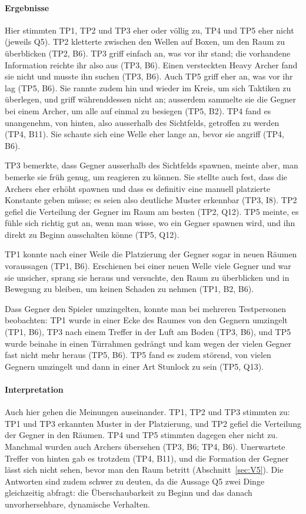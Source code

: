 \documentclass[../Main.tex]{subfiles}
\begin{document}
\paragraph{Ergebnisse}
Hier stimmten TP1, TP2 und TP3 eher oder völlig zu, TP4 und TP5 eher nicht (jeweils Q5). TP2 kletterte zwischen den Wellen auf Boxen, um den Raum zu überblicken (TP2, B6). TP3 griff einfach an, was vor ihr stand; die vorhandene Information reichte ihr also aus (TP3, B6). Einen versteckten Heavy Archer fand sie nicht und musste ihn suchen (TP3, B6). Auch TP5 griff eher an, was vor ihr lag (TP5, B6). Sie rannte zudem hin und wieder im Kreis, um sich Taktiken zu überlegen, und griff währenddessen nicht an; ausserdem sammelte sie die Gegner bei einem Archer, um alle auf einmal zu besiegen (TP5, B2). TP4 fand es unangenehm, von hinten, also ausserhalb des Sichtfelds, getroffen zu werden (TP4, B11). Sie schaute sich eine Welle eher lange an, bevor sie angriff (TP4, B6).

TP3 bemerkte, dass Gegner ausserhalb des Sichtfelds spawnen, meinte aber, man bemerke sie früh genug, um reagieren zu können. Sie stellte auch fest, dass die Archers eher erhöht spawnen und dass es definitiv eine manuell platzierte Konstante geben müsse; es seien also deutliche Muster erkennbar (TP3, I8). TP2 gefiel die Verteilung der Gegner im Raum am besten (TP2, Q12). TP5 meinte, es fühle sich richtig gut an, wenn man wisse, wo ein Gegner spawnen wird, und ihn direkt zu Beginn ausschalten könne (TP5, Q12).

TP1 konnte nach einer Weile die Platzierung der Gegner sogar in neuen Räumen voraussagen (TP1, B6). Erschienen bei einer neuen Welle viele Gegner und war sie unsicher, sprang sie heraus und versuchte, den Raum zu überblicken und in Bewegung zu bleiben, um keinen Schaden zu nehmen (TP1, B2, B6).

Dass Gegner den Spieler umzingelten, konnte man bei mehreren Testpersonen beobachten: TP1 wurde in einer Ecke des Raumes von den Gegnern umzingelt (TP1, B6), TP3 nach einem Treffer in der Luft am Boden (TP3, B6), und TP5 wurde beinahe in einen Türrahmen gedrängt und kam wegen der vielen Gegner fast nicht mehr heraus (TP5, B6). TP5 fand es zudem störend, von vielen Gegnern umzingelt und dann in einer Art Stunlock zu sein (TP5, Q13).

\paragraph{Interpretation}
Auch hier gehen die Meinungen auseinander. TP1, TP2 und TP3 stimmten zu: TP1 und TP3 erkannten Muster in der Platzierung, und TP2 gefiel die Verteilung der Gegner in den Räumen. TP4 und TP5 stimmten dagegen eher nicht zu. Manchmal wurden auch Archers übersehen (TP3, B6; TP4, B6). Unerwartete Treffer von hinten gab es trotzdem (TP4, B11), und die Formation der Gegner lässt sich nicht sehen, bevor man den Raum betritt (Abschnitt~\ref{sec:V5}). Die Antworten sind zudem schwer zu deuten, da die Aussage Q5 zwei Dinge gleichzeitig abfragt: die Überschaubarkeit zu Beginn und das danach unvorhersehbare, dynamische Verhalten.
\end{document}
